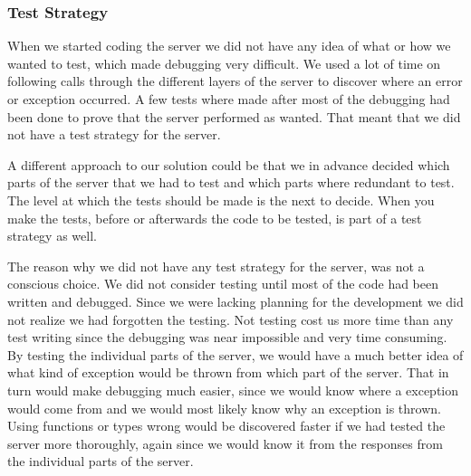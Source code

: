 \subsubsection{Test Strategy}
When we started coding the server we did not have any idea of what or how we wanted to test, which made debugging very difficult. We used a lot of time on following calls through the different layers of the server to discover where an error or exception occurred. A few tests where made after most of the debugging had been done to prove that the server performed as wanted. That meant that we did not have a test strategy for the server.

A different approach to our solution could be that we in advance decided which parts of the server that we had to test and which parts where redundant to test. The level at which the tests should be made is the next to decide. When you make the tests, before or afterwards the code to be tested, is part of a test strategy as well.

The reason why we did not have any test strategy for the server, was not a conscious choice. We did not consider testing until most of the code had been written and debugged. Since we were lacking planning for the development we did not realize we had forgotten the testing. Not testing cost us more time than any test writing since the debugging was near impossible and very time consuming. By testing the individual parts of the server, we would have a much better idea of what kind of exception would be thrown from which part of the server. That in turn would make debugging much easier, since we would know where a exception would come from and we would most likely know why an exception is thrown. Using functions or types wrong would be discovered faster if we had tested the server more thoroughly, again since we would know it from the responses from the individual parts of the server.